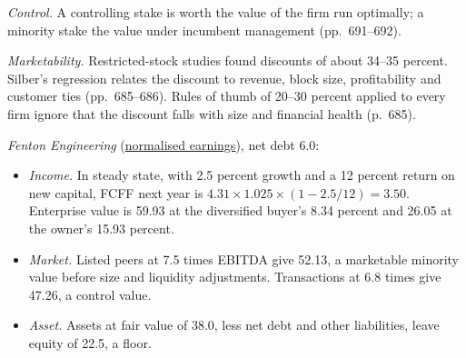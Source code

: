 \begin{qfmethod}
\emph{Control.} A controlling stake is worth the value of the firm run optimally; a minority stake the value under incumbent management (pp.~691--692).

\emph{Marketability.} Restricted-stock studies found discounts of about 34--35 percent. Silber's regression relates the discount to revenue, block size, profitability and customer ties (pp.~685--686). Rules of thumb of 20--30 percent applied to every firm ignore that the discount falls with size and financial health (p.~685).

 \emph{Fenton Engineering} (\hyperref[meth:private-earnings-normalisation]{normalised earnings}), net debt 6.0:
\begin{itemize}
\item \emph{Income.} In steady state, with 2.5 percent growth and a 12 percent return on new capital, FCFF next year is $4.31\times1.025\times(1-2.5/12)=3.50$. Enterprise value is 59.93 at the diversified buyer's 8.34 percent and 26.05 at the owner's 15.93 percent.
\item \emph{Market.} Listed peers at 7.5 times EBITDA give 52.13, a marketable minority value before size and liquidity adjustments. Transactions at 6.8 times give 47.26, a control value.
\item \emph{Asset.} Assets at fair value of 38.0, less net debt and other liabilities, leave equity of 22.5, a floor.
\end{itemize}


\end{qfmethod}
